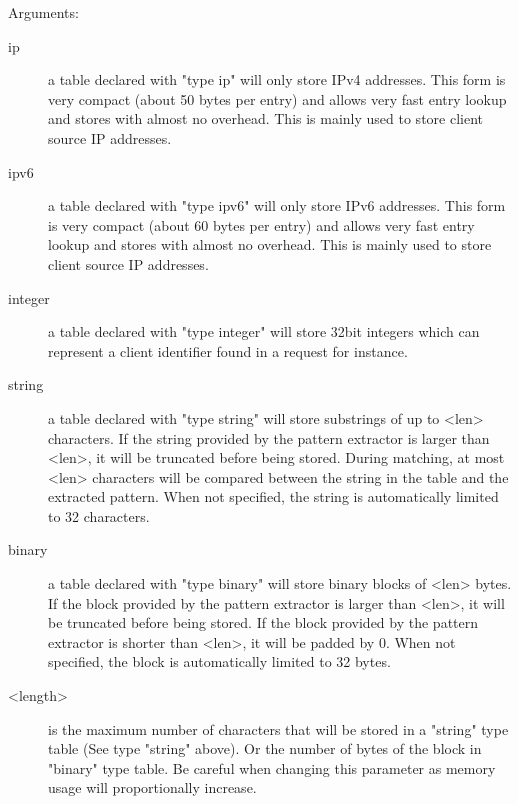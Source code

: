 
  Arguments:
  \begin{description}
  \item[ip] a table declared with "type ip" will only store IPv4 addresses.
               This form is very compact (about 50 bytes per entry) and allows
               very fast entry lookup and stores with almost no overhead. This
               is mainly used to store client source IP addresses.

  \item[ipv6] a table declared with "type ipv6" will only store IPv6 addresses.
               This form is very compact (about 60 bytes per entry) and allows
               very fast entry lookup and stores with almost no overhead. This
               is mainly used to store client source IP addresses.

  \item[integer] a table declared with "type integer" will store 32bit integers
               which can represent a client identifier found in a request for
               instance.

  \item[string] a table declared with "type string" will store substrings of up
               to <len> characters. If the string provided by the pattern
               extractor is larger than <len>, it will be truncated before
               being stored. During matching, at most <len> characters will be
               compared between the string in the table and the extracted
               pattern. When not specified, the string is automatically limited
               to 32 characters.

  \item[binary] a table declared with "type binary" will store binary blocks
               of <len> bytes. If the block provided by the pattern
               extractor is larger than <len>, it will be truncated before
               being stored. If the block provided by the pattern extractor
               is shorter than <len>, it will be padded by 0. When not
               specified, the block is automatically limited to 32 bytes.

  \item[<length>] is the maximum number of characters that will be stored in a
               "string" type table (See type "string" above). Or the number
               of bytes of the block in "binary" type table. Be careful when
               changing this parameter as memory usage will proportionally
               increase.


\end{description}
